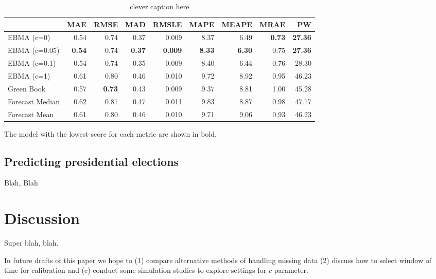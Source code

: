 \documentclass[12pt,fullpage,endnotes]{article}
\begin{document}
\begin{table}[ht]
\caption{clever caption here}
\begin{center}
\begin{tabular}{lrrrrrrrr}
\toprule
 & MAE & RMSE & MAD & RMSLE & MAPE & MEAPE & MRAE & PW \\ 
\midrule
 EBMA (c=0)& 0.54 & 0.74 & 0.37 & 0.009 & 8.37 & 6.49 & \textbf{0.73} & \textbf{27.36} \\ 
  EBMA (c=0.05)& \textbf{0.54} & 0.74 &\textbf{ 0.37} & \textbf{0.009} & \textbf{8.33} & \textbf{6.30} & 0.75 & \textbf{27.36} \\ 
 EBMA (c=0.1)& 0.54 & 0.74 & 0.35 & 0.009 & 8.40 & 6.44 & 0.76 & 28.30 \\ 
EBMA (c=1) & 0.61 & 0.80 & 0.46 & 0.010 & 9.72 & 8.92 & 0.95 & 46.23 \\ 
 Green Book& 0.57 & \textbf{0.73} & 0.43 & 0.009 & 9.37 & 8.81 & 1.00 & 45.28 \\ 
 Forecast Median& 0.62 & 0.81 & 0.47 & 0.011 & 9.83 & 8.87 & 0.98 & 47.17 \\ 
Forecast Mean& 0.61 & 0.80 & 0.46 & 0.010 & 9.71 & 9.06 & 0.93 & 46.23 \\ 
\bottomrule
\end{tabular}
\end{center}

The model with the lowest score for each metric are shown in bold.  
\end{table}


\subsection{Predicting presidential elections}

Blah, Blah



\section{Discussion} 


Super blah, blah.  

In future drafts of this paper we hope to (1) compare alternative
methods of handling missing data (2) discuss how to select window of
time for calibration and (c) conduct some simulation studies to
explore settings for $c$ parameter.




\singlespacing


\end{document}
